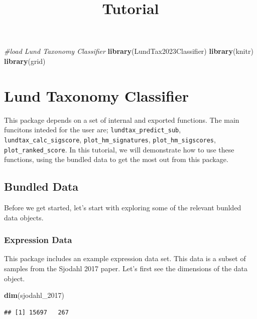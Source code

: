 \documentclass[
]{article}
\title{Tutorial}
\author{}
\date{\vspace{-2.5em}}
\newenvironment{Shaded}{\begin{snugshade}}{\end{snugshade}}
\newcommand{\CommentTok}[1]{\textcolor[rgb]{0.56,0.35,0.01}{\textit{#1}}}
\newcommand{\FunctionTok}[1]{\textcolor[rgb]{0.13,0.29,0.53}{\textbf{#1}}}
\newcommand{\NormalTok}[1]{#1}
\begin{document}
\maketitle

\begin{Shaded}
\begin{Highlighting}[]
\CommentTok{\#load Lund Taxonomy Classifier}
\FunctionTok{library}\NormalTok{(LundTax2023Classifier)}
\FunctionTok{library}\NormalTok{(knitr)}
\FunctionTok{library}\NormalTok{(grid)}
\end{Highlighting}
\end{Shaded}

\section{Lund Taxonomy Classifier}\label{lund-taxonomy-classifier}

This package depends on a set of internal and exported functions. The
main funcitons inteded for the user are; \texttt{lundtax\_predict\_sub},
\texttt{lundtax\_calc\_sigscore}, \texttt{plot\_hm\_signatures},
\texttt{plot\_hm\_sigscores}, \texttt{plot\_ranked\_score}. In this
tutorial, we will demonstrate how to use these functions, using the
bundled data to get the most out from this package.

\subsection{Bundled Data}\label{bundled-data}

Before we get started, let's start with exploring some of the relevant
bunlded data objects.

\subsubsection{Expression Data}\label{expression-data}

This package includes an example expression data set. This data is a
subset of samples from the Sjodahl 2017 paper. Let's first see the
dimensions of the data object.

\begin{Shaded}
\begin{Highlighting}[]
\FunctionTok{dim}\NormalTok{(sjodahl\_2017)}
\end{Highlighting}
\end{Shaded}

\begin{verbatim}
## [1] 15697   267
\end{verbatim}
\end{document}
